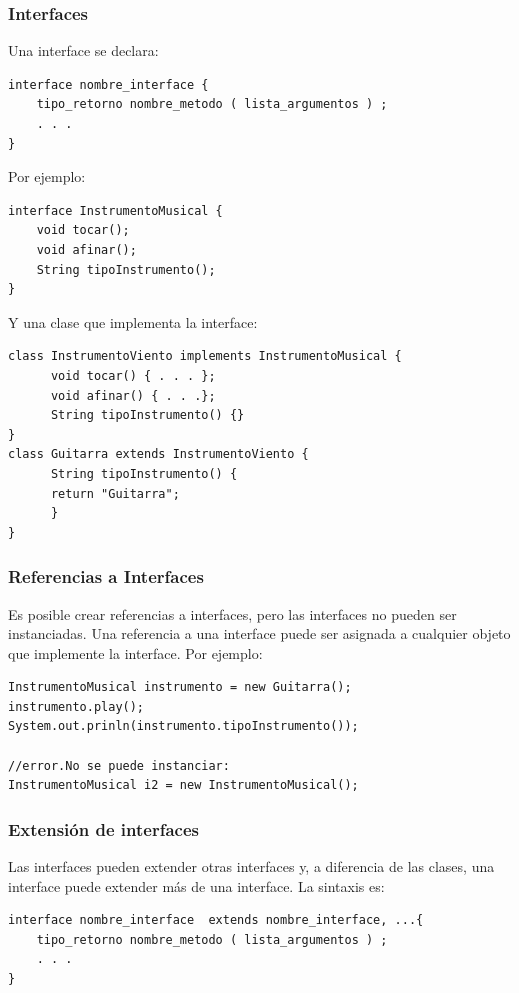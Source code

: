 \documentclass{beamer}
\begin{document}
\begin{frame}[fragile]
\frametitle{Interfaces}
Una interface se declara:
{\color{yellow}
\begin{verbatim}
interface nombre_interface {
    tipo_retorno nombre_metodo ( lista_argumentos ) ;
    . . . 
}
\end{verbatim}}
\pause
Por ejemplo:
\begin{footnotesize}
{\color{yellow}
\begin{verbatim}
interface InstrumentoMusical {
    void tocar();
    void afinar();
    String tipoInstrumento();
}
\end{verbatim}}
\end{footnotesize}
\pause
Y una clase que implementa la interface:
\begin{scriptsize}
{\color{yellow}
\begin{verbatim}
class InstrumentoViento implements InstrumentoMusical {
      void tocar() { . . . };
      void afinar() { . . .};
      String tipoInstrumento() {}
}
class Guitarra extends InstrumentoViento {
      String tipoInstrumento() {
      return "Guitarra";
      }
}   
\end{verbatim}}
\end{scriptsize}
\end{frame}


\begin{frame}[fragile]
\frametitle{Referencias a Interfaces}
Es posible crear referencias a interfaces, pero las interfaces no pueden ser instanciadas. Una referencia a una interface puede ser asignada a cualquier objeto que implemente la interface. Por ejemplo:
{\color{yellow}
\begin{verbatim}
InstrumentoMusical instrumento = new Guitarra();
instrumento.play();
System.out.prinln(instrumento.tipoInstrumento());

//error.No se puede instanciar:
InstrumentoMusical i2 = new InstrumentoMusical(); 
\end{verbatim}}
\end{frame}

\begin{frame}[fragile]
\frametitle{Extensión de interfaces}
Las interfaces pueden extender otras interfaces y, a diferencia de las clases, una interface puede extender más de una interface. La sintaxis es:
{\color{cyan}
\begin{verbatim}
interface nombre_interface  extends nombre_interface, ...{
    tipo_retorno nombre_metodo ( lista_argumentos ) ;
    . . . 
}
\end{verbatim}}
\end{frame}
\end{document}
